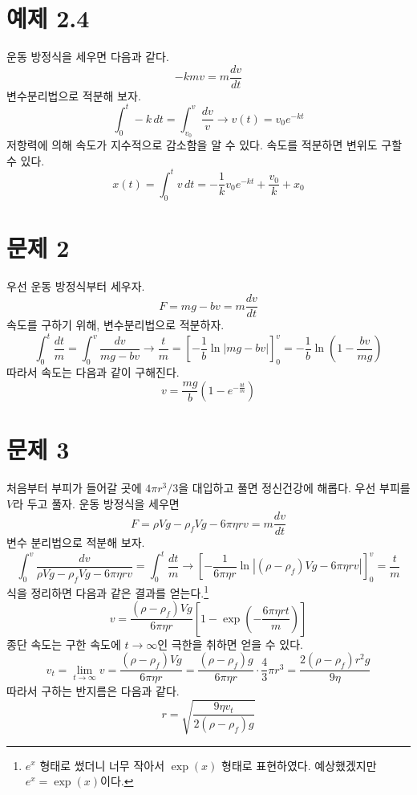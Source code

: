 \documentclass{scrartcl}
\title{\doctitle}
\author{Project Eclipse (손량)}
\date{Last compiled on: \today, \currenttime}
\begin{document}
\maketitle

\section{예제 2.4}
운동 방정식을 세우면 다음과 같다.
\[-kmv=m\frac{dv}{dt}\]
변수분리법으로 적분해 보자.
\[\int^t_0-k\,dt=\int^v_{v_0}\frac{dv}{v}\longrightarrow v(t)=v_0 e^{-kt}\]
저항력에 의해 속도가 지수적으로 감소함을 알 수 있다. 속도를 적분하면 변위도 구할 수 있다.
\[x(t)=\int^t_0 v\,dt=-\frac{1}{k}v_0 e^{-kt}+\frac{v_0}{k}+x_0\]

\section{문제 2}
우선 운동 방정식부터 세우자.
\[F=mg-bv=m\frac{dv}{dt}\]
속도를 구하기 위해, 변수분리법으로 적분하자.
\[\int^t_0\frac{dt}{m}=\int^v_0\frac{dv}{mg-bv}\longrightarrow\frac{t}{m}=\left[-\frac{1}{b}\ln|mg-bv|\right]^v_0=-\frac{1}{b}\ln\left(1-\frac{bv}{mg}\right)\]
따라서 속도는 다음과 같이 구해진다.
\[v=\frac{mg}{b}\left(1-e^{-\frac{bt}{m}}\right)\]

\section{문제 3}
처음부터 부피가 들어갈 곳에 \(4\pi r^3/3\)을 대입하고 풀면 정신건강에 해롭다. 우선 부피를 \(V\)라 두고 풀자. 운동 방정식을 세우면
\[F=\rho Vg-\rho_f Vg-6\pi\eta rv=m\frac{dv}{dt}\]
변수 분리법으로 적분해 보자.
\[\int^v_0 \frac{dv}{\rho Vg-\rho_f Vg-6\pi\eta rv}=\int^t_0\frac{dt}{m}\longrightarrow\left[-\frac{1}{6\pi\eta r}\ln\left|(\rho-\rho_f)Vg-6\pi\eta rv\right|\right]^v_0=\frac{t}{m}\]
식을 정리하면 다음과 같은 결과를 얻는다.\footnote{\(e^x\) 형태로 썼더니 너무 작아서 \(\exp(x)\) 형태로 표현하였다. 예상했겠지만 \(e^x=\exp(x)\)이다.}
\[v=\frac{(\rho-\rho_f)Vg}{6\pi\eta r}\left[1-\exp\left(-\frac{6\pi\eta rt}{m}\right)\right]\]
종단 속도는 구한 속도에 \(t\to\infty\)인 극한을 취하면 얻을 수 있다.
\[v_t=\lim_{t\to\infty} v=\frac{(\rho-\rho_f)Vg}{6\pi\eta r}=\frac{(\rho-\rho_f)g}{6\pi\eta r}\cdot\frac{4}{3}\pi r^3=\frac{2(\rho-\rho_f)r^2g}{9\eta}\]
따라서 구하는 반지름은 다음과 같다.
\[r=\sqrt{\frac{9\eta v_t}{2(\rho-\rho_f)g}}\]
\end{document}
